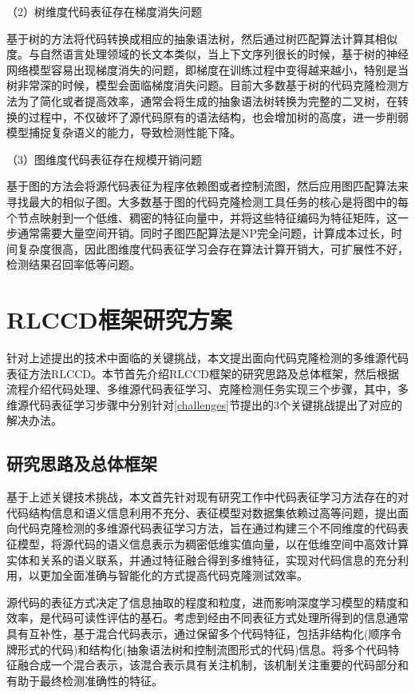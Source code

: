 （2）树维度代码表征存在梯度消失问题

基于树的方法将代码转换成相应的抽象语法树，然后通过树匹配算法计算其相似度。与自然语言处理领域的长文本类似，当上下文序列很长的时候，基于树的神经网络模型容易出现梯度消失的问题，即梯度在训练过程中变得越来越小，特别是当树非常深的时候，模型会面临梯度消失问题。目前大多数基于树的代码克隆检测方法为了简化或者提高效率，通常会将生成的抽象语法树转换为完整的二叉树，在转换的过程中，不仅破坏了源代码原有的语法结构，也会增加树的高度，进一步削弱模型捕捉复杂语义的能力，导致检测性能下降。

（3）图维度代码表征存在规模开销问题

基于图的方法会将源代码表征为程序依赖图或者控制流图，然后应用图匹配算法来寻找最大的相似子图。大多数基于图的代码克隆检测工具任务的核心是将图中的每个节点映射到一个低维、稠密的特征向量中，并将这些特征编码为特征矩阵，这一步通常需要大量空间开销。同时子图匹配算法是NP完全问题，计算成本过长，时间复杂度很高，因此图维度代码表征学习会存在算法计算开销大，可扩展性不好，检测结果召回率低等问题。

\section{RLCCD框架研究方案}
针对上述提出的技术中面临的关键挑战，本文提出面向代码克隆检测的多维源代码表征方法RLCCD。本节首先介绍RLCCD框架的研究思路及总体框架，然后根据流程介绍代码处理、多维源代码表征学习、克隆检测任务实现三个步骤，其中，多维源代码表征学习步骤中分别针对\ref{challenges}节提出的3个关键挑战提出了对应的解决办法。

\subsection{研究思路及总体框架}

基于上述关键技术挑战，本文首先针对现有研究工作中代码表征学习方法存在的对代码结构信息和语义信息利用不充分、表征模型对数据集依赖过高等问题，提出面向代码克隆检测的多维源代码表征学习方法，旨在通过构建三个不同维度的代码表征模型，将源代码的语义信息表示为稠密低维实值向量，以在低维空间中高效计算实体和关系的语义联系，并通过特征融合得到多维特征，实现对代码信息的充分利用，以更加全面准确与智能化的方式提高代码克隆测试效率。 

源代码的表征方式决定了信息抽取的程度和粒度，进而影响深度学习模型的精度和效率，是代码可读性评估的基石。考虑到经由不同表征方式处理所得到的信息通常具有互补性，基于混合代码表示，通过保留多个代码特征，包括非结构化(顺序令牌形式的代码)和结构化(抽象语法树和控制流图形式的代码)信息。将多个代码特征融合成一个混合表示，该混合表示具有关注机制，该机制关注重要的代码部分和有助于最终检测准确性的特征。

